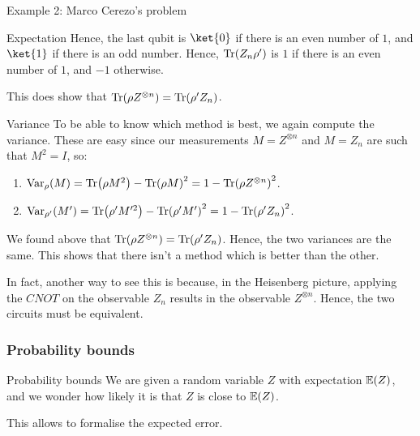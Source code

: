 \documentclass[a4paper]{article}
\begin{document}
\begin{parag}{Example 2: Marco Cerezo's problem}
\begin{subparag}{Expectation}
        Hence, the last qubit is $\ket{0}$ if there is an even number of $1$, and $\ket{1}$ if there is an odd number. Hence, $\Tr\left(Z_n \rho'\right)$ is $1$ if there is an even number of $1$, and $-1$ otherwise.

        This does show that $\Tr\left(\rho Z^{\otimes n}\right) = \Tr\left(\rho' Z_n\right)$.
    \end{subparag}

    \begin{subparag}{Variance}
        To be able to know which method is best, we again compute the variance. These are easy since our measurements $M = Z^{\otimes n}$ and $M = Z_n$ are such that $M^2 = I$, so:
        \begin{enumerate}[left=0pt]
            \item $\Var_{\rho}\left(M\right) = \Tr\left(\rho M^2\right) - \Tr\left(\rho M\right)^2 = 1 - \Tr\left(\rho Z^{\otimes n}\right)^2$.
            \item $\Var_{\rho'}\left(M'\right) = \Tr\left(\rho' M'^2\right) - \Tr\left(\rho' M'\right)^2 = 1 - \Tr\left(\rho' Z_n\right)^2$. 
        \end{enumerate}

        We found above that $\Tr\left(\rho Z^{\otimes n}\right) = \Tr\left(\rho' Z_n\right)$. Hence, the two variances are the same. This shows that there isn't a method which is better than the other.

        In fact, another way to see this is because, in the Heisenberg picture, applying the $CNOT$ on the observable $Z_n$ results in the observable $Z^{\otimes n}$. Hence, the two circuits must be equivalent.
    \end{subparag}
\end{parag}

\subsubsection{Probability bounds}

\begin{parag}{Probability bounds}
    We are given a random variable $Z$ with expectation $\exval\left(Z\right)$, and we wonder how likely it is that $Z$ is close to $\exval\left(Z\right)$.

    This allows to formalise the expected error.
\end{parag}
\end{document}
